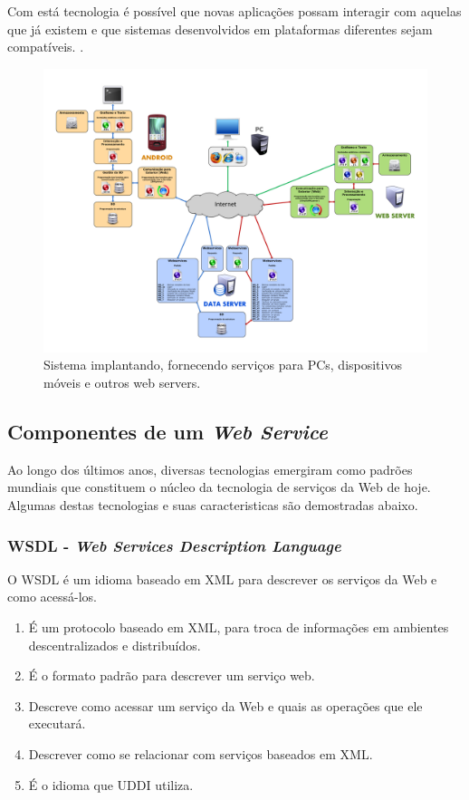 \documentclass[12pt]{article}
\begin{document}
Com está tecnologia é possível que novas aplicações possam interagir com aquelas que já existem e que sistemas desenvolvidos em plataformas diferentes sejam compatíveis. 
 \cite{webservece}.
\begin{figure}[H]
	\centering
	\includegraphics[scale=0.14]{Imagens/webservice.png}
	\caption{Sistema implantando, fornecendo serviços para PCs, dispositivos móveis e outros web servers.}
	\label{wbs}
\end{figure} 


\subsection{Componentes de um \textit{Web Service}}
Ao longo dos últimos anos, diversas tecnologias emergiram como padrões mundiais que constituem o núcleo da tecnologia de serviços da Web de hoje. Algumas destas tecnologias e suas caracteristicas são demostradas abaixo.


\subsubsection{WSDL - \textit{Web Services Description Language} }
O WSDL é um idioma baseado em XML para descrever os serviços da Web e como acessá-los.

\begin{enumerate}
	\item É um protocolo baseado em XML, para troca de informações em ambientes descentralizados e distribuídos.
	\item É o formato padrão para descrever um serviço web.
	\item Descreve como acessar um serviço da Web e quais as operações que ele executará.
	\item Descrever como se relacionar com serviços baseados em XML.
	\item É o idioma que UDDI utiliza.
	
\end{enumerate}
\end{document}
